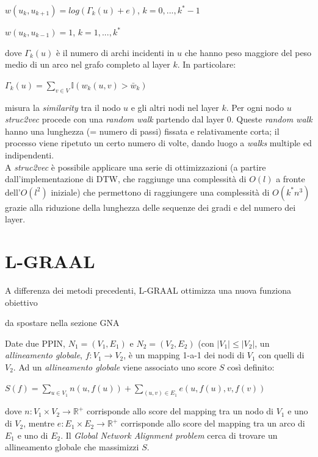 \documentclass[11pt]{article}
\begin{document}
\begin{center}
$w(u_k,u_{k+1}) = log(\Gamma_k(u) + e)$, $k = 0,...,k^*-1$
\end{center}
\begin{center}
$w(u_k,u_{k-1}) = 1$, $k = 1,...,k^*$
\end{center}
dove $\Gamma_k(u)$ è il numero di archi incidenti in $u$ che hanno peso maggiore del peso medio di un arco nel grafo completo al layer $k$. In particolare:
\begin{center}
$\Gamma_k(u) = \displaystyle{\sum_{v \in V}} \mathbb{I}(w_k(u,v) > \bar w_k)$
\end{center}
misura la \textit{similarity} tra il nodo $u$ e gli altri nodi nel layer $k$.
Per ogni nodo $u$ \textit{struc2vec} procede con una \textit{random walk} partendo dal layer 0. Queste \textit{random walk} hanno una lunghezza (= numero di passi) fissata e relativamente corta; il processo viene ripetuto un certo numero di volte, dando luogo a \textit{walks} multiple ed indipendenti.\\

A \textit{struc2vec} è possibile applicare una serie di ottimizzazioni (a partire dall'implementazione di DTW, che raggiunge una complessità di $O(l)$ a fronte dell'$O(l^2)$ iniziale) che permettono di raggiungere una complessità di $O(k^*n^3)$ grazie alla riduzione della lunghezza delle sequenze dei gradi e del numero dei layer.
\pagebreak

\section{L-GRAAL}
A differenza dei metodi precedenti, L-GRAAL ottimizza una nuova funziona obiettivo









da spostare nella sezione GNA

Date due PPIN, $N_1 = (V_1, E_1)$ e $N_2 = (V_2, E_2)$ (con $|V_1| \leq |V_2|$, un \textit{allineamento globale}, $f: V_1 \rightarrow V_2$, è un mapping 1-a-1 dei nodi di $V_1$ con quelli di $V_2$. Ad un \textit{allineamento globale} viene associato uno score $S$ così definito:
\begin{center}
$S(f) = \displaystyle{\sum_{u \in V_1}n(u,f(u))} + \displaystyle{\sum_{(u,v) \in E_1}e(u,f(u),v,f(v))}$
\end{center}
dove $n : V_1 \times V_2 \rightarrow \mathbb{R}^+$ corrisponde allo score del mapping tra un nodo di $V_1$ e uno di $V_2$, mentre $e : E_1 \times E_2 \rightarrow \mathbb{R}^+$ corrisponde allo score del mapping tra un arco di $E_1$ e uno di $E_2$. Il \textit{Global Network Alignment problem} cerca di trovare un allineamento globale che massimizzi $S$.
\end{document}
